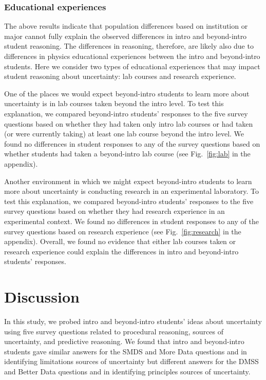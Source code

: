 \documentclass[english,aps,prstper,reprint,showpacs,longbibliography,superscriptaddress,nofootinbib]{revtex4-2}
\begin{document}
\subsubsection{Educational experiences}

The above results indicate that population differences based on institution or major cannot fully explain the observed differences in intro and beyond-intro student reasoning. The differences in reasoning, therefore, are likely also due to differences in physics educational experiences between the intro and beyond-intro students. Here we consider two types of educational experiences that may impact student reasoning about uncertainty: lab courses and research experience.

One of the places we would expect beyond-intro students to learn more about uncertainty is in lab courses taken beyond the intro level. To test this explanation, we compared beyond-intro students' responses to the five survey questions based on whether they had taken only intro lab courses or had taken (or were currently taking) at least one lab course beyond the intro level. We found no differences in student responses to any of the survey questions based on whether students had taken a beyond-intro lab course (see Fig.~\ref{fig:lab} in the appendix).

Another environment in which we might expect beyond-intro students to learn more about uncertainty is conducting research in an experimental laboratory. To test this explanation, we compared beyond-intro students' responses to the five survey questions based on whether they had research experience in an experimental context. We found no differences in student responses to any of the survey questions based on research experience (see Fig.~\ref{fig:research} in the appendix). Overall, we found no evidence that either lab courses taken or research experience could explain the differences in intro and beyond-intro students' responses.

\section{Discussion}

In this study, we probed intro and beyond-intro students' ideas about uncertainty using five survey questions related to procedural reasoning, sources of uncertainty, and predictive reasoning. We found that intro and beyond-intro students gave similar answers for the SMDS and More Data questions and in identifying limitations sources of uncertainty but different answers for the DMSS and Better Data questions and in identifying principles sources of uncertainty.
\end{document}
